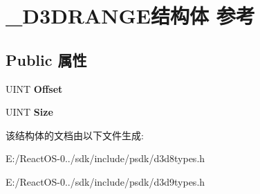 \hypertarget{struct___d3_d_r_a_n_g_e}{}\section{\+\_\+\+D3\+D\+R\+A\+N\+G\+E结构体 参考}
\label{struct___d3_d_r_a_n_g_e}
\subsection*{Public 属性}
\begin{DoxyCompactItemize}
\item 
\mbox{\label{struct___d3_d_r_a_n_g_e_a9dc9a554ea54e20137e75c16a8826758}} 
U\+I\+NT {\bfseries Offset}
\item 
\mbox{\label{struct___d3_d_r_a_n_g_e_aea117c2c9fe7e51f8dff7a40992cf06b}} 
U\+I\+NT {\bfseries Size}
\end{DoxyCompactItemize}


该结构体的文档由以下文件生成\+:\begin{DoxyCompactItemize}
\item 
E\+:/\+React\+O\+S-\/0../sdk/include/psdk/d3d8types.\+h\item 
E\+:/\+React\+O\+S-\/0../sdk/include/psdk/d3d9types.\+h\end{DoxyCompactItemize}
